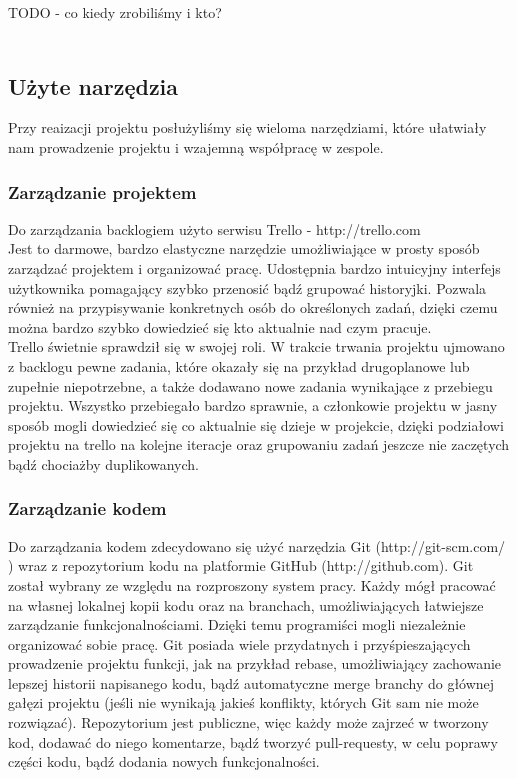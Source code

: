 \documentclass[polish,12pt]{aghthesis}
\begin{document}
 TODO - co kiedy zrobiliśmy i kto?
\\\\

\subsection{Użyte narzędzia}

Przy reaizacji projektu posłużyliśmy się wieloma narzędziami, które ułatwiały nam prowadzenie projektu i wzajemną współpracę w zespole.
\\

\subsubsection{Zarządzanie projektem}

Do zarządzania backlogiem użyto serwisu Trello - http://trello.com
\\

Jest to darmowe, bardzo elastyczne narzędzie umożliwiające w prosty sposób zarządzać projektem i organizować pracę. Udostępnia bardzo intuicyjny interfejs użytkownika pomagający szybko przenosić bądź grupować historyjki. Pozwala również na przypisywanie konkretnych osób do określonych zadań, dzięki czemu można bardzo szybko dowiedzieć się kto aktualnie nad czym pracuje.
\\

Trello świetnie sprawdził się w swojej roli. W trakcie trwania projektu ujmowano z backlogu pewne zadania, które okazały się na przykład drugoplanowe lub zupełnie niepotrzebne, a także dodawano nowe zadania wynikające z przebiegu projektu. Wszystko przebiegało bardzo sprawnie, a członkowie projektu w jasny sposób mogli dowiedzieć się co aktualnie się dzieje w projekcie, dzięki podziałowi projektu na trello na kolejne iteracje oraz grupowaniu zadań jeszcze nie zaczętych bądź chociażby duplikowanych. 
\\

\subsubsection{Zarządzanie kodem}

Do zarządzania kodem zdecydowano się użyć narzędzia Git (http://git-scm.com/ ) wraz z repozytorium kodu na platformie GitHub (http://github.com). Git został wybrany ze względu na rozproszony system pracy. Każdy mógł pracować na własnej lokalnej kopii kodu oraz na branchach, umożliwiających łatwiejsze zarządzanie funkcjonalnościami. Dzięki temu programiści mogli niezależnie organizować sobie pracę. Git posiada wiele przydatnych i przyśpieszających prowadzenie projektu funkcji, jak na przykład rebase, umożliwiający zachowanie lepszej historii napisanego kodu, bądź automatyczne merge branchy do głównej gałęzi projektu (jeśli nie wynikają jakieś konflikty, których Git sam nie może rozwiązać). Repozytorium jest publiczne, więc każdy może zajrzeć w tworzony kod, dodawać do niego komentarze, bądź tworzyć pull-requesty, w celu poprawy części kodu, bądź dodania nowych funkcjonalności. 
\end{document}
